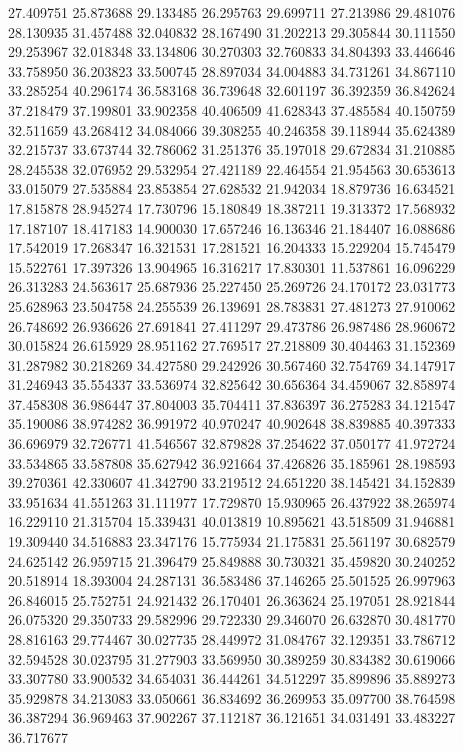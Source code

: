 27.409751
25.873688
29.133485
26.295763
29.699711
27.213986
29.481076
28.130935
31.457488
32.040832
28.167490
31.202213
29.305844
30.111550
29.253967
32.018348
33.134806
30.270303
32.760833
34.804393
33.446646
33.758950
36.203823
33.500745
28.897034
34.004883
34.731261
34.867110
33.285254
40.296174
36.583168
36.739648
32.601197
36.392359
36.842624
37.218479
37.199801
33.902358
40.406509
41.628343
37.485584
40.150759
32.511659
43.268412
34.084066
39.308255
40.246358
39.118944
35.624389
32.215737
33.673744
32.786062
31.251376
35.197018
29.672834
31.210885
28.245538
32.076952
29.532954
27.421189
22.464554
21.954563
30.653613
33.015079
27.535884
23.853854
27.628532
21.942034
18.879736
16.634521
17.815878
28.945274
17.730796
15.180849
18.387211
19.313372
17.568932
17.187107
18.417183
14.900030
17.657246
16.136346
21.184407
16.088686
17.542019
17.268347
16.321531
17.281521
16.204333
15.229204
15.745479
15.522761
17.397326
13.904965
16.316217
17.830301
11.537861
16.096229
26.313283
24.563617
25.687936
25.227450
25.269726
24.170172
23.031773
25.628963
23.504758
24.255539
26.139691
28.783831
27.481273
27.910062
26.748692
26.936626
27.691841
27.411297
29.473786
26.987486
28.960672
30.015824
26.615929
28.951162
27.769517
27.218809
30.404463
31.152369
31.287982
30.218269
34.427580
29.242926
30.567460
32.754769
34.147917
31.246943
35.554337
33.536974
32.825642
30.656364
34.459067
32.858974
37.458308
36.986447
37.804003
35.704411
37.836397
36.275283
34.121547
35.190086
38.974282
36.991972
40.970247
40.902648
38.839885
40.397333
36.696979
32.726771
41.546567
32.879828
37.254622
37.050177
41.972724
33.534865
33.587808
35.627942
36.921664
37.426826
35.185961
28.198593
39.270361
42.330607
41.342790
33.219512
24.651220
38.145421
34.152839
33.951634
41.551263
31.111977
17.729870
15.930965
26.437922
38.265974
16.229110
21.315704
15.339431
40.013819
10.895621
43.518509
31.946881
19.309440
34.516883
23.347176
15.775934
21.175831
25.561197
30.682579
24.625142
26.959715
21.396479
25.849888
30.730321
35.459820
30.240252
20.518914
18.393004
24.287131
36.583486
37.146265
25.501525
26.997963
26.846015
25.752751
24.921432
26.170401
26.363624
25.197051
28.921844
26.075320
29.350733
29.582996
29.722330
29.346070
26.632870
30.481770
28.816163
29.774467
30.027735
28.449972
31.084767
32.129351
33.786712
32.594528
30.023795
31.277903
33.569950
30.389259
30.834382
30.619066
33.307780
33.900532
34.654031
36.444261
34.512297
35.899896
35.889273
35.929878
34.213083
33.050661
36.834692
36.269953
35.097700
38.764598
36.387294
36.969463
37.902267
37.112187
36.121651
34.031491
33.483227
36.717677
